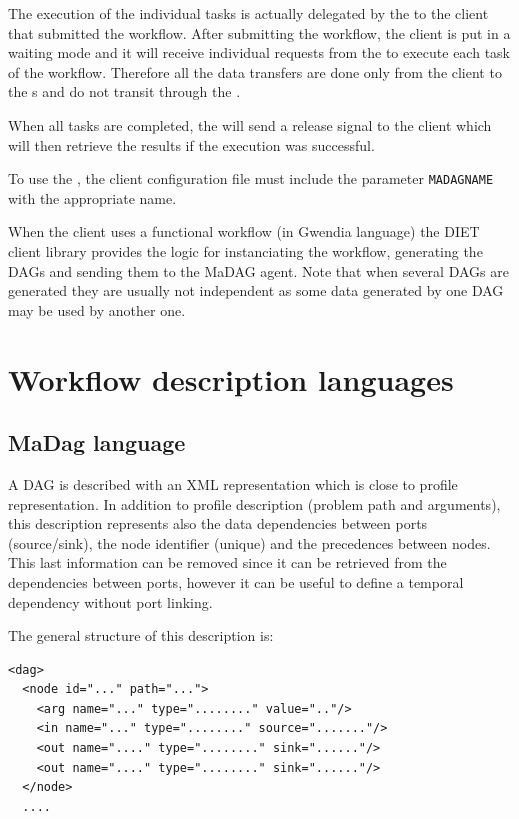 The execution of the individual tasks is actually delegated by the
\madag to the client that submitted the workflow. After submitting
the workflow, the client is put in a waiting mode and it will
receive individual requests from the \madag to execute each task
of the workflow. Therefore all the data transfers are done only
from the client to the {\sed}s and do not transit through the \madag.

When all tasks are completed, the \madag will send a release signal
to the client which will then retrieve the results if the execution
was successful.

To use the \madag, the client configuration file must include
the parameter \texttt{MADAGNAME} with the appropriate name.

When the client uses a functional workflow (in Gwendia language) the
DIET client library provides the logic for instanciating the workflow,
generating the DAGs and sending them to the MaDAG agent. Note that
when several DAGs are generated they are usually not independent as
some data generated by one DAG may be used by another one.

\section{Workflow description languages}

\subsection{MaDag language}
\label{sec:dag_desc}

A DAG is described with an XML representation which is close
to \diet profile representation. In addition to profile description
(problem path and arguments), this description represents also the
data dependencies between ports (source/sink), the node identifier
(unique) and the precedences between nodes. This last information can
be removed since it can be retrieved from the dependencies between
ports, however it can be useful to define a temporal dependency
without port linking.

The general structure of this description is:

\begin{verbatim}
<dag>
  <node id="..." path="...">
    <arg name="..." type="........" value=".."/>
    <in name="..." type="........" source="......."/>
    <out name="...." type="........" sink="......"/>
    <out name="...." type="........" sink="......"/>
  </node>
  ....
\end{verbatim}

